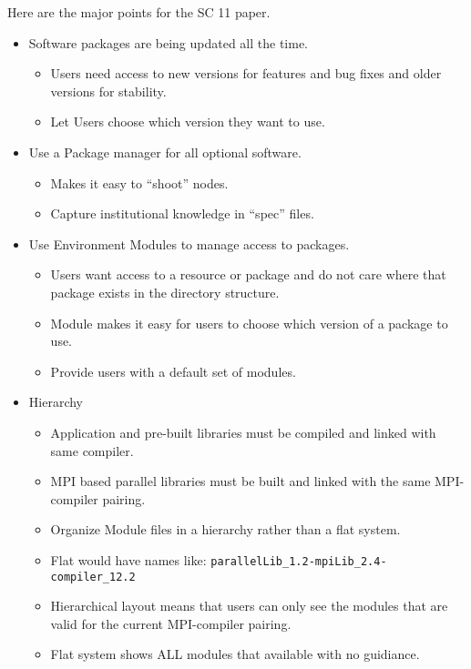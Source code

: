 \documentclass[12pt]{article}
\begin{document}
Here are the major points for the SC 11 paper.

\begin{itemize}
  \item Software packages are being updated all the time.
    \begin{itemize}
      \item Users need access to new versions for features and bug
        fixes and older versions for stability.
      \item Let Users choose which version they want to use.
    \end{itemize}

  \item Use a Package manager for all optional software.
    \begin{itemize}
      \item Makes it easy to ``shoot'' nodes.
      \item Capture institutional knowledge in ``spec'' files.
    \end{itemize}

  \item Use Environment Modules to manage access to packages.
    \begin{itemize}
      \item Users want access to a resource or package and do not care
        where that package exists in the directory structure.
      \item Module makes it easy for users to choose which version of
        a package to use.
      \item Provide users with a default set of modules.
    \end{itemize}

  \item Hierarchy
    \begin{itemize}
      \item Application and pre-built libraries must be compiled and
        linked with same compiler.
      \item MPI based parallel libraries must be built and linked with
        the same MPI-compiler pairing.
      \item Organize Module files in a hierarchy rather than a flat system.
      \item Flat would have names like:
        \texttt{parallelLib\_1.2-mpiLib\_2.4-compiler\_12.2}
      \item Hierarchical layout means that users can only see the
        modules that are valid for the current MPI-compiler pairing.
      \item Flat system shows ALL modules that available with no guidiance.
    \end{itemize}



\end{itemize}
\end{document}

